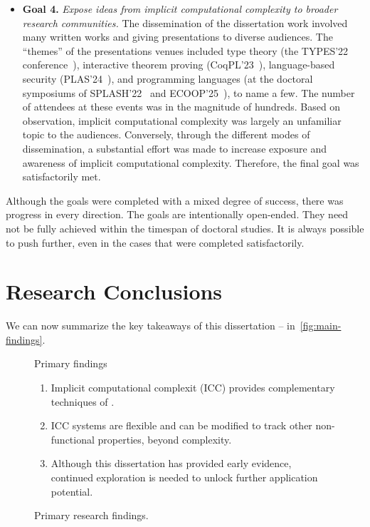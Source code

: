 \begin{itemize}
\item[\iconDONE]\textbf{Goal 4.}
\emph{Expose ideas from implicit computational complexity to broader research
communities.} The dissemination of the dissertation work involved many written
works and giving presentations to diverse audiences. The \enquote{themes} of the
presentations venues included type theory (the TYPES'22
conference~\cite{aubert202217}), interactive theorem proving
(CoqPL'23~\cite{aubert20231}), language-based security
(PLAS'24~\cite{plas2024}), and programming languages (at the doctoral
symposiums of SPLASH'22~\cite{splash22} and ECOOP'25~\cite{rusch20257}), to name
a few. The number of attendees at these events was in the magnitude of hundreds.
Based on observation, implicit computational complexity was largely an
unfamiliar topic to the audiences. Conversely, through the different modes of
dissemination, a substantial effort was made to increase exposure and awareness
of implicit computational complexity. Therefore, the final goal was
satisfactorily met.

\end{itemize}

Although the goals were completed with a mixed degree of success, there was
progress in every direction. The goals are intentionally open-ended. They need
not be fully achieved within the timespan of doctoral studies. It is always
possible to push further, even in the cases that were completed satisfactorily.

\section{Research Conclusions}
\label{ssec:findings}

We can now summarize the key takeaways of this dissertation -- in~\autoref{fig:main-findings}.

\begin{figure}[htb]
\begin{infobox}{Primary findings}
\begin{enumerate}[wide, labelwidth=!, labelindent=0pt]

\item Implicit computational complexit (ICC) provides complementary
techniques of .

\item ICC systems are flexible and can be modified to track other
non-functional properties, beyond complexity. 

\item Although this dissertation has provided early evidence, continued
exploration is needed to unlock further application potential.

\end{enumerate}
\end{infobox}
\caption[Primary research findings]{Primary research findings.}
\label{fig:main-findings}
\end{figure}


